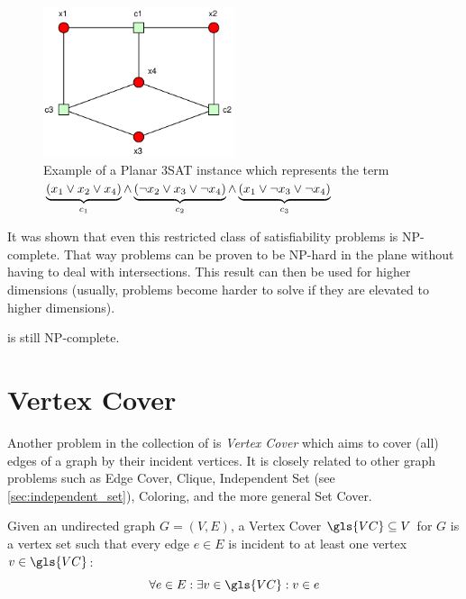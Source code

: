 \begin{figure}[ht]
  \centering
  \includegraphics[width=0.5\textwidth]{img/example_planar_3SAT.pdf}
  \caption{\label{fig:example_planar_3SAT}Example of a Planar 3SAT %
    instance which represents the term \(%
      \protect\underbrace{(x_1 \lor x_2 \lor x_4)}_{c_1}\land%
      \protect\underbrace{(\lnot x_2 \lor x_3 \lor \lnot x_4)}_{c_2}\land%
      \protect\underbrace{(x_1 \lor \lnot x_3 \lor \lnot x_4)}_{c_3}%
    \)}
\end{figure}

It was shown that even this restricted class of satisfiability
problems is NP-complete. That way problems can be proven to be
NP-hard in the plane without having to deal with intersections. This
result can then be used for higher dimensions (usually, problems
become harder to solve if they are elevated to higher dimensions).

\begin{theorem}
   is still NP-complete.~\cite{planar_3SAT}
\end{theorem}

\section{Vertex Cover}
\label{sec:vertex_cover}
Another problem in the collection of \cite{karp_np_complete} is
\emph{Vertex Cover} which aims to cover (all) edges of a graph by
their incident vertices. It is closely related to other graph problems
such as Edge Cover, Clique, Independent Set
(see \cref{sec:independent_set}), Coloring, and the more general Set
Cover.

\begin{definition}
  \label{def:vertex_cover}
  Given an undirected graph \(G=(V,E)\), a Vertex Cover
  \(\gls{VC} \subseteq V\) for \(G\) is a vertex set such that
  every edge \(e \in E\) is incident to at least one vertex
  \(v \in \gls{VC}\):
  \[ \forall e \in E: \exists v \in \gls{VC}: v \in e \]
\end{definition}

